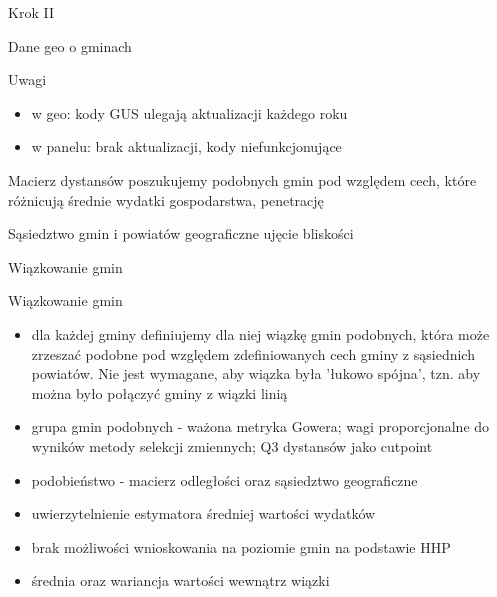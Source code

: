 \documentclass{beamer}
\begin{document}
	\begin{frame}{Krok II}
		\begin{block}{Dane geo o gminach}
		\end{block}
		\begin{block}{Uwagi}
			\begin{itemize}
				\item{w geo: kody GUS ulegają aktualizacji każdego roku}
				\item{w panelu: brak aktualizacji, kody niefunkcjonujące}
			\end{itemize}
		\end{block}
		\begin{block}{Macierz dystansów}
			poszukujemy podobnych gmin pod względem cech, które różnicują średnie wydatki gospodarstwa, penetrację
		\end{block}
		\begin{block}{Sąsiedztwo gmin i powiatów}
			geograficzne ujęcie bliskości
		\end{block}
	\end{frame}
	
	\begin{frame}{Wiązkowanie gmin}
	\end{frame}
	
	\begin{frame}{Wiązkowanie gmin}
		\begin{block}{}
			\begin{itemize}
				\item{dla każdej gminy definiujemy dla niej wiązkę gmin podobnych, która może zrzeszać podobne pod względem zdefiniowanych cech gminy z sąsiednich powiatów. Nie jest wymagane, aby wiązka była 'łukowo spójna', tzn. aby można było połączyć gminy z wiązki linią}
				\item{grupa gmin podobnych - ważona metryka Gowera; wagi proporcjonalne do wyników metody selekcji zmiennych; Q3 dystansów jako cutpoint}
				\item{podobieństwo - macierz odległości oraz sąsiedztwo geograficzne}
				\item{uwierzytelnienie estymatora średniej wartości wydatków}
				\item{brak możliwości wnioskowania na poziomie gmin na podstawie HHP}
				\item{średnia oraz wariancja wartości wewnątrz wiązki}
			\end{itemize}
		\end{block}
	\end{frame}
\end{document}
